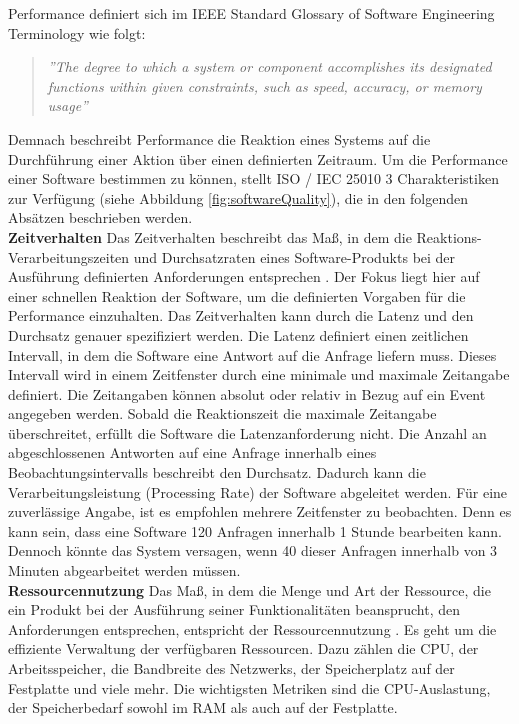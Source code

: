 \noindent
Performance definiert sich im IEEE Standard Glossary of Software Engineering Terminology wie folgt:
\begin{quote}
	\emph{''The degree to which a system or component accomplishes its designated functions within given constraints, such as speed, accuracy, or memory usage''} \cite{.}
\end{quote}

\noindent
Demnach beschreibt Performance die Reaktion eines Systems auf die Durchführung einer Aktion über einen definierten Zeitraum. Um die Performance einer Software bestimmen zu können, stellt ISO / IEC 25010 3 Charakteristiken zur Verfügung (siehe Abbildung \ref{fig:softwareQuality}), die in den folgenden Absätzen beschrieben werden.\\

\noindent
\textbf{Zeitverhalten}\newline
Das Zeitverhalten beschreibt das Maß, in dem die Reaktions- Verarbeitungszeiten und Durchsatzraten eines Software-Produkts bei der Ausführung definierten Anforderungen entsprechen \cite{ISOIEC.}. Der Fokus liegt hier auf einer schnellen Reaktion der Software, um die definierten Vorgaben für die Performance einzuhalten. Das Zeitverhalten kann durch die Latenz und den Durchsatz genauer spezifiziert werden. Die Latenz definiert einen zeitlichen Intervall, in dem die Software eine Antwort auf die Anfrage liefern muss. Dieses Intervall wird in einem Zeitfenster durch eine minimale und maximale Zeitangabe definiert. Die Zeitangaben können absolut oder relativ in Bezug auf ein Event angegeben werden. Sobald die Reaktionszeit die maximale Zeitangabe überschreitet, erfüllt die Software die Latenzanforderung nicht. Die Anzahl an abgeschlossenen Antworten auf eine Anfrage innerhalb eines Beobachtungsintervalls beschreibt den Durchsatz. Dadurch kann die Verarbeitungsleistung (Processing Rate) der Software abgeleitet werden. Für eine zuverlässige Angabe, ist es empfohlen mehrere Zeitfenster zu beobachten. Denn es kann sein, dass eine Software 120 Anfragen innerhalb 1 Stunde bearbeiten kann. Dennoch könnte das System versagen, wenn 40 dieser Anfragen innerhalb von 3 Minuten abgearbeitet werden müssen. \cite{Barbacci.1995}  \\

\noindent
\textbf{Ressourcennutzung}\newline
Das Maß, in dem die Menge und Art der Ressource, die ein Produkt bei der Ausführung seiner Funktionalitäten beansprucht, den Anforderungen entsprechen, entspricht der Ressourcennutzung \cite{ISOIEC.}. Es geht um die effiziente Verwaltung der verfügbaren Ressourcen. Dazu zählen die CPU, der Arbeitsspeicher, die Bandbreite des Netzwerks, der Speicherplatz auf der Festplatte und viele mehr. Die wichtigsten Metriken sind die CPU-Auslastung, der Speicherbedarf sowohl im RAM als auch auf der Festplatte. \cite{Barbacci.1995}  \\

